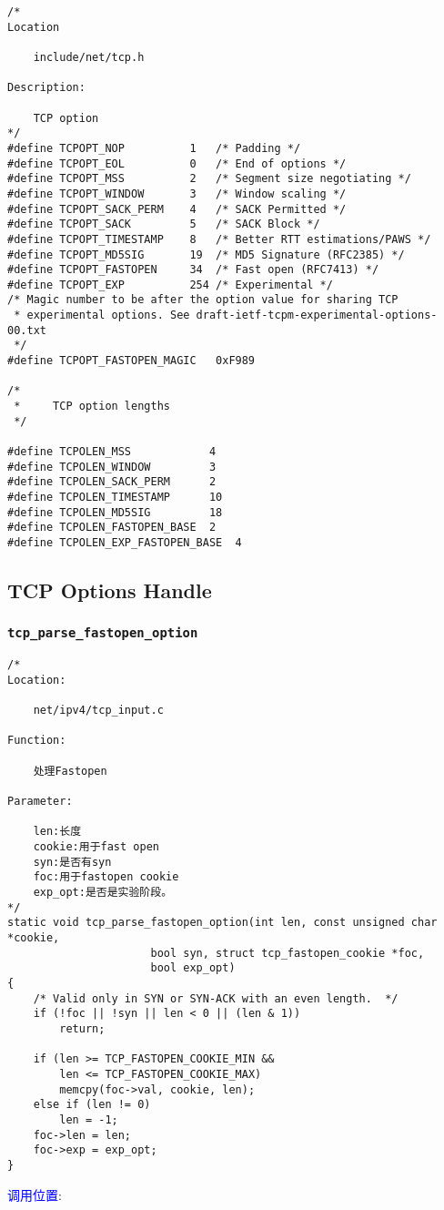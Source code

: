 \begin{verbatim}
/*
Location

    include/net/tcp.h
    
Description:
    
    TCP option
*/
#define TCPOPT_NOP          1   /* Padding */
#define TCPOPT_EOL          0   /* End of options */
#define TCPOPT_MSS          2   /* Segment size negotiating */
#define TCPOPT_WINDOW       3   /* Window scaling */
#define TCPOPT_SACK_PERM    4   /* SACK Permitted */
#define TCPOPT_SACK         5   /* SACK Block */
#define TCPOPT_TIMESTAMP    8   /* Better RTT estimations/PAWS */
#define TCPOPT_MD5SIG       19  /* MD5 Signature (RFC2385) */
#define TCPOPT_FASTOPEN     34  /* Fast open (RFC7413) */
#define TCPOPT_EXP          254 /* Experimental */
/* Magic number to be after the option value for sharing TCP
 * experimental options. See draft-ietf-tcpm-experimental-options-00.txt
 */
#define TCPOPT_FASTOPEN_MAGIC   0xF989

/*
 *     TCP option lengths
 */

#define TCPOLEN_MSS            4
#define TCPOLEN_WINDOW         3
#define TCPOLEN_SACK_PERM      2
#define TCPOLEN_TIMESTAMP      10
#define TCPOLEN_MD5SIG         18
#define TCPOLEN_FASTOPEN_BASE  2
#define TCPOLEN_EXP_FASTOPEN_BASE  4
\end{verbatim}

    \subsection{TCP Options Handle}        
        \subsubsection{\texttt{tcp_parse_fastopen_option}}
            \label{TCPOptions:tcp_parse_fastopen_option}
\begin{verbatim}
/*
Location:

    net/ipv4/tcp_input.c

Function:

    处理Fastopen

Parameter:

    len:长度
    cookie:用于fast open
    syn:是否有syn
    foc:用于fastopen cookie
    exp_opt:是否是实验阶段。
*/
static void tcp_parse_fastopen_option(int len, const unsigned char *cookie,
                      bool syn, struct tcp_fastopen_cookie *foc,
                      bool exp_opt)
{
    /* Valid only in SYN or SYN-ACK with an even length.  */
    if (!foc || !syn || len < 0 || (len & 1))
        return;

    if (len >= TCP_FASTOPEN_COOKIE_MIN &&
        len <= TCP_FASTOPEN_COOKIE_MAX)
        memcpy(foc->val, cookie, len);
    else if (len != 0)
        len = -1;
    foc->len = len;
    foc->exp = exp_opt;
}
\end{verbatim}
        \textcolor{blue}{调用位置}:

